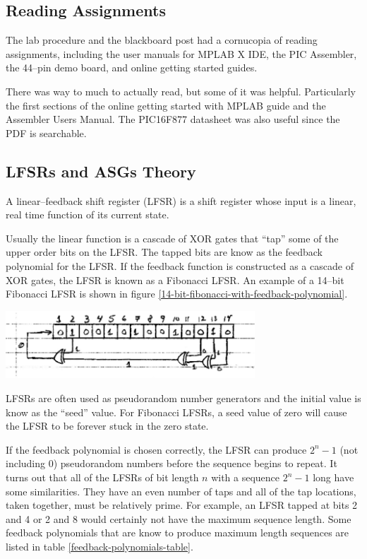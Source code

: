 \documentclass[11pt]{article}
\begin{document}
\subsection{Reading Assignments}

The lab procedure and the blackboard post had a cornucopia of reading assignments,
including the user manuals for MPLAB X IDE, the PIC Assembler, the 44--pin demo board,
and online getting started guides.

There was way to much to actually read, but some of it was helpful. Particularly
the first sections of the online getting started with MPLAB guide and the Assembler
Users Manual. The PIC16F877 datasheet was also useful since the PDF is searchable.

\subsection{LFSRs and ASGs Theory}

A linear--feedback shift register (LFSR) is a shift register whose input is a linear,
real time function of its current state.

Usually the linear function is a cascade of XOR gates that ``tap'' some of the upper
order bits on the LFSR. The tapped bits are know as the feedback polynomial for the
LFSR. If the feedback function is constructed as a cascade of XOR gates, the LFSR
is known as a Fibonacci LFSR. An example of a 14--bit Fibonacci LFSR is shown 
in figure \ref{14-bit-fibonacci-with-feedback-polynomial}.

\begin{center}
	\includegraphics[width=0.7\textwidth]{Figures/14-bit-fibonacci-with-feedback-polynomial.pdf}
	\label{14-bit-fibonacci-with-feedback-polynomial}
\end{center}

LFSRs are often used as pseudorandom number generators and the initial value is know
as the ``seed'' value. For Fibonacci LFSRs, a seed value of zero will cause the LFSR
to be forever stuck in the zero state.

If the feedback polynomial is chosen correctly, the LFSR can produce $2^{n}-1$
(not including 0) pseudorandom numbers before the sequence begins to repeat.
It turns out that all of the LFSRs of bit length $n$ with a sequence $2^{n}-1$
long have some similarities. They have an even number of taps and all of the tap
locations, taken together, must be relatively prime. For example, an LFSR tapped
at bits 2 and 4 or 2 and 8 would certainly not have the maximum sequence length.
Some feedback polynomials that are know to produce maximum length sequences are
listed in table \ref{feedback-polynomials-table}.
\end{document}
